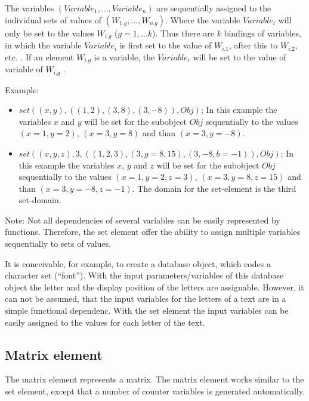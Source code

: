 The variables $(Variable_1, \ldots, Variable_n)$ are sequentially assigned to the individual sets of values of $(W_{1.g}, \ldots, W_{n.g})$. Where the variable $Variable_i$ will only be set to the values  $W_{i.g}$ ($g=1, \ldots k$). Thus there are $k$ bindings of variables, in which the variable $Variable_i$ is first set to the value of $W_{i.1}$, after this to $W_{i.2}$, etc. . If an element $W_{i.g}$ is a variable, the $Variable_i$ will be set to the value of variable of $W_{i.g}$ .

\bigskip\noindent
Example:
\begin{itemize}
 \item $set( (x, y),( (1,2), (3,8), (3,-8) ), Obj)$; In this example the variables $x$ and $y$ will be set for the subobject $Obj$ sequentially to the values $(x=1, y=2)$, $(x=3, y=8)$ and than $(x=3, y=-8)$.
 \item $set( (x, y, z), 3,( (1, 2, 3), (3, g=8 ,15), (3,-8, b=-1) ), Obj)$; In this example the variables $x$, $y$ and $z$ will be set for the subobject $Obj$ sequentially to the values $(x=1, y=2, z=3)$, $(x=3, y=8, z=15)$ and than $(x=3, y=-8, z=-1)$. The domain for the set-element is the third set-domain.
\end{itemize}

\bigskip\noindent
Note:
Not all dependencies of several variables can be easily represented by functions. Therefore, the set element offer the ability to assign multiple variables sequentially to sets of values.

It is conceivable, for example, to create a database object, which codes a character set (``font''). With the input parameters/variables of this database object the letter and the display position of the letters are assignable. However, it can not be assumed, that the input variables for the letters of a text are in a simple functional dependenc. With the set element the input variables can be easily assigned to the values for each letter of the text.



\subsection{Matrix element}
\label{secFibMatrixElement}

\bigskip\noindent
The matrix element represents a matrix. The matrix element works similar to the set element, except that a number of counter variables is generated automatically.

